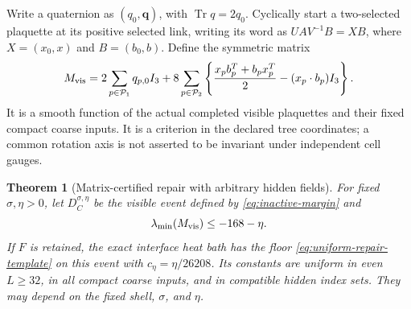 \documentclass[11pt,oneside,openany]{book}
\newtheorem{theorem}{Theorem}[chapter]
\theoremstyle{definition}
\theoremstyle{remark}
\newcommand{\Tr}{\operatorname{Tr}}
\begin{document}
Write a quaternion as $(q_0,\mathbf q)$, with $\Tr q=2q_0$.
Cyclically start a two-selected plaquette at its positive selected
link, writing its word as $UAV^{-1}B=XB$, where $X=(x_0,x)$ and
$B=(b_0,b)$. Define the symmetric matrix
\begin{equation}\label{eq:visible-matrix}
 M_{\rm vis}=2\sum_{p\in\mathcal P_1}q_{p,0}I_3
  +8\sum_{p\in\mathcal P_2}
       \left\{\frac{x_pb_p^T+b_px_p^T}{2}-(x_p\cdot b_p)I_3\right\}.
\end{equation}
It is a smooth function of the actual completed visible plaquettes
and their fixed compact coarse inputs. It is a criterion in the
declared tree coordinates; a common rotation axis is not asserted to
be invariant under independent cell gauges.

\begin{theorem}[Matrix-certified repair with arbitrary hidden fields]
\label{thm:matrix-repair}
For fixed $\sigma,\eta>0$, let $D_C^{\sigma,\eta}$ be the visible
event defined by \cref{eq:inactive-margin} and
\begin{equation}\label{eq:matrix-negative-test}
 \lambda_{\min}(M_{\rm vis})\le-168-\eta.
\end{equation}
If $F$ is retained, the exact interface heat bath has the floor
\cref{eq:uniform-repair-template} on this event with
$c_\eta=\eta/26208$. Its constants are uniform in even $L\ge32$,
in all compact coarse inputs, and in compatible hidden index sets.
They may depend on the fixed shell, $\sigma$, and $\eta$.
\end{theorem}
\end{document}
